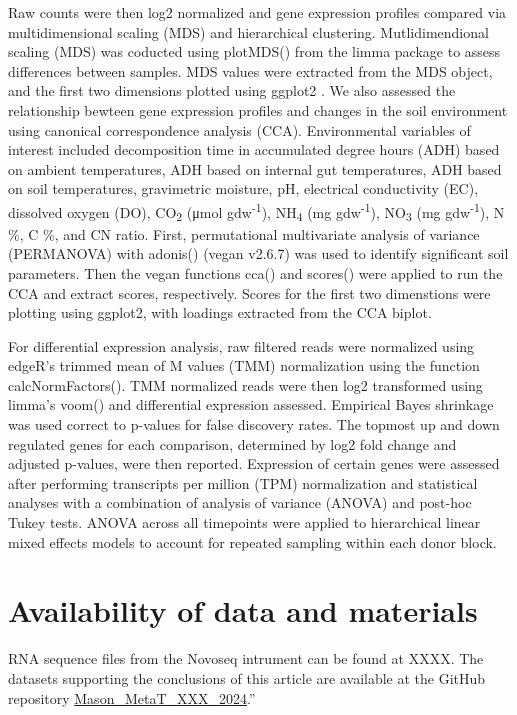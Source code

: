 \documentclass[
  sn-nature,
  lineno, referee]{sn-jnl}
\begin{document}
Raw counts were then log2 normalized and gene expression profiles
compared via multidimensional scaling (MDS) and hierarchical clustering.
Mutlidimendional scaling (MDS) was coducted using plotMDS() from the
limma package to assess differences between samples. MDS values were
extracted from the MDS object, and the first two dimensions plotted
using ggplot2 \citep{wickham_ggplot2_2016}. We also assessed the
relationship bewteen gene expression profiles and changes in the soil
environment using canonical correspondence analysis (CCA). Environmental
variables of interest included decomposition time in accumulated degree
hours (ADH) based on ambient temperatures, ADH based on internal gut
temperatures, ADH based on soil temperatures, gravimetric moisture, pH,
electrical conductivity (EC), dissolved oxygen (DO), CO\textsubscript{2}
(μmol gdw\textsuperscript{-1}), NH\textsubscript{4} (mg
gdw\textsuperscript{-1}), NO\textsubscript{3} (mg
gdw\textsuperscript{-1}), N \%, C \%, and CN ratio. First, permutational
multivariate analysis of variance (PERMANOVA) with adonis() (vegan
v2.6.7) \citep{oksanen_vegan_2024} was used to identify significant soil
parameters. Then the vegan functions cca() and scores() were applied to
run the CCA and extract scores, respectively. Scores for the first two
dimenstions were plotting using ggplot2, with loadings extracted from
the CCA biplot.

For differential expression analysis, raw filtered reads were normalized
using edgeR's trimmed mean of M values (TMM) normalization using the
function calcNormFactors(). TMM normalized reads were then log2
transformed using limma's voom() and differential expression assessed.
Empirical Bayes shrinkage was used correct to p-values for false
discovery rates. The topmost up and down regulated genes for each
comparison, determined by log2 fold change and adjusted p-values, were
then reported. Expression of certain genes were assessed after
performing transcripts per million (TPM) normalization and statistical
analyses with a combination of analysis of variance (ANOVA) and post-hoc
Tukey tests. ANOVA across all timepoints were applied to hierarchical
linear mixed effects models to account for repeated sampling within each
donor block.

\section{Availability of data and
materials}\label{availability-of-data-and-materials}

RNA sequence files from the Novoseq intrument can be found at XXXX. The
datasets supporting the conclusions of this article are available at the
GitHub repository
\href{https://github.com/amason30/Mason_MetaT_XXX_2024}{Mason\_MetaT\_XXX\_2024}.''
\end{document}
